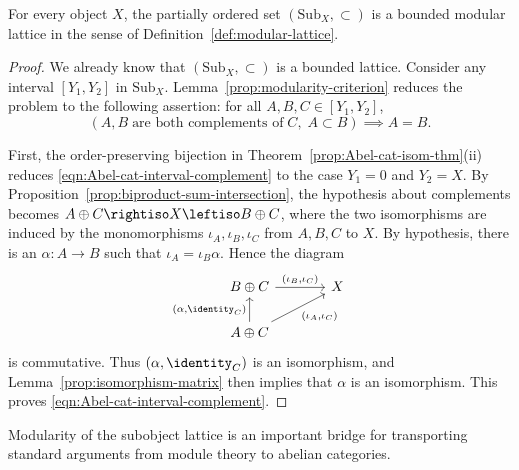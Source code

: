 \begin{theorem}\label{prop:subobject-modularity}
	For every object $X$, the partially ordered set
	$(\mathrm{Sub}_X,\subset)$ is a bounded modular lattice in the sense of
	Definition~\ref{def:modular-lattice}.
\end{theorem}
\begin{proof}
	We already know that $(\mathrm{Sub}_X,\subset)$ is a bounded lattice.
	Consider any interval $[Y_1,Y_2]$ in $\mathrm{Sub}_X$.
	Lemma~\ref{prop:modularity-criterion} reduces the problem to the following
	assertion: for all $A,B,C\in[Y_1,Y_2]$,
	\begin{equation}\label{eqn:Abel-cat-interval-complement}
		\left( A, B \;\text{are both complements of}\; C, \; A \subset B \right) \implies A = B.
	\end{equation}

	First, the order-preserving bijection in
	Theorem~\ref{prop:Abel-cat-isom-thm}(ii) reduces
	\eqref{eqn:Abel-cat-interval-complement} to the case $Y_1=0$ and $Y_2=X$.
	By Proposition~\ref{prop:biproduct-sum-intersection}, the hypothesis about
	complements becomes $A\oplus C\rightiso X\leftiso B\oplus C$, where the
	two isomorphisms are induced by the monomorphisms
	$\iota_A,\iota_B,\iota_C$ from $A,B,C$ to $X$. By hypothesis, there is an
	$\alpha:A\to B$ such that $\iota_A=\iota_B\alpha$. Hence the diagram
	\[\begin{tikzcd}[column sep=large]
		B \oplus C \arrow[r, "{(\iota_B, \iota_C)}"] & X \\
		A \oplus C \arrow[ru, "{(\iota_A, \iota_C)}"'] \arrow[u, "{(\alpha, \identity_C)}"] &
	\end{tikzcd}\]
	is commutative. Thus $(\alpha,\identity_C)$ is an isomorphism, and
	Lemma~\ref{prop:isomorphism-matrix} then implies that $\alpha$ is an
	isomorphism. This proves \eqref{eqn:Abel-cat-interval-complement}.
\end{proof}

Modularity of the subobject lattice is an important bridge for transporting
standard arguments from module theory to abelian categories.
